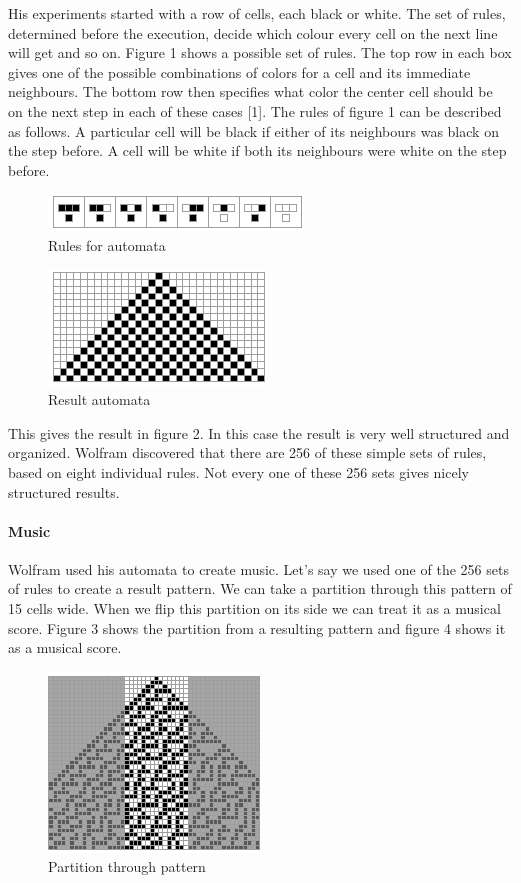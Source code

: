 \documentclass[12pt]{article}
\begin{document}
His experiments started with a row of cells, each black or white. The set of rules, determined before the execution, decide which colour every cell on the next line will get and so on. Figure 1 shows a possible set of rules. The top row in each box gives one of the possible combinations of colors for a cell and its immediate neighbours. The bottom row then specifies what color the center cell should be on the next step in each of these cases [1]. The rules of figure 1 can be described as follows. A particular cell will be black if either of its neighbours was black on the step before. A cell will be white if both its neighbours were white on the step before.

\begin{figure}[h]
\centering
\includegraphics[]{img/wolframRules}
\caption{Rules for automata}
\end{figure}

\begin{figure}[h]
\centering
\includegraphics[]{img/wolframResult-15}
\caption{Result automata}
\end{figure}

This gives the result in figure 2. In this case the result is very well structured and organized. Wolfram discovered that there are 256 of these simple sets of rules, based on eight individual rules. Not every one of these 256 sets gives nicely structured results.

\paragraph{Music}

Wolfram used his automata to create music. Let's say we used one of the 256 sets of rules to create a result pattern. We can take a partition through this pattern of 15 cells wide. When we flip this partition on its side we can treat it as a musical score.
Figure 3 shows the partition from a resulting pattern and figure 4 shows it as a musical score.

 \begin{figure}[h]
\centering
\includegraphics[]{img/wolframMusic1}
\caption{Partition through pattern}
\end{figure}
\end{document}
